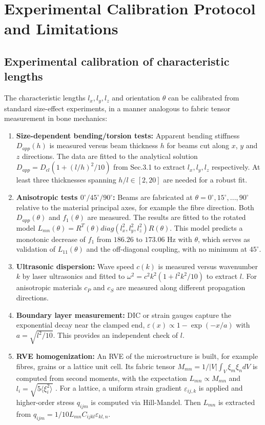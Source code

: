 \documentclass[final,3p,times,fleqn]{elsarticle}
\begin{document}
\section{Experimental Calibration Protocol and Limitations}
\label{sec:calibration}

\subsection{Experimental calibration of characteristic lengths}
\label{sec:exp_calib}
The characteristic lengths $l_x,l_y,l_z$ and orientation $\theta$ can be calibrated from standard size-effect experiments, in a manner analogous to fabric tensor measurement in bone mechanics:

\begin{enumerate}
  \item \textbf{Size-dependent bending/torsion tests:} Apparent bending stiffness $D_{app}(h)$ is measured versus beam thickness $h$ for beams cut along $x$, $y$ and $z$ directions. The data are fitted to the analytical solution $D_{app}=D_{cl}(1+ (l/h)^2/10)$ from Sec.3.1 to extract $l_x,l_y,l_z$ respectively. At least three thicknesses spanning $h/l\in[2,20]$ are needed for a robust fit.
  \item \textbf{Anisotropic tests $0^\circ/45^\circ/90^\circ$:} Beams are fabricated at $\theta=0^\circ,15^\circ,...,90^\circ$ relative to the material principal axes, for example the fibre direction. Both $D_{app}(\theta)$ and $f_1(\theta)$ are measured. The results are fitted to the rotated model $L_{mn}(\theta)=R^T(\theta)diag(l_x^2,l_y^2,l_z^2)R(\theta)$. This model predicts a monotonic decrease of $f_1$ from $186.26$ to $173.06$ Hz with $\theta$, which serves as validation of $L_{11}(\theta)$ and the off-diagonal coupling, with no minimum at $45^\circ$.
  \item \textbf{Ultrasonic dispersion:} Wave speed $c(k)$ is measured versus wavenumber $k$ by laser ultrasonics and fitted to $\omega^2=c^2k^2(1+l^2k^2/10)$ to extract $l$. For anisotropic materials $c_P$ and $c_S$ are measured along different propagation directions.
  \item \textbf{Boundary layer measurement:} DIC or strain gauges capture the exponential decay near the clamped end, $\varepsilon(x)\propto 1-\exp(-x/a)$ with $a=\sqrt{l^2/10}$. This provides an independent check of $l$.
  \item \textbf{RVE homogenization:} An RVE of the microstructure is built, for example fibres, grains or a lattice unit cell. Its fabric tensor $M_{mn}=1/|V|\int_V \xi_m\xi_n dV$ is computed from second moments, with the expectation $L_{mn}\propto M_{mn}$ and $l_i=\sqrt{5\langle\xi_i^2\rangle}$ \cite{Polizzotto2018}. For a lattice, a uniform strain gradient $\varepsilon_{ij,k}$ is applied and higher-order stress $q_{ijm}$ is computed via Hill-Mandel. Then $L_{mn}$ is extracted from $q_{ijm}=1/10 L_{mn} C_{ijkl}\varepsilon_{kl,n}$.

\end{enumerate}
\end{document}
